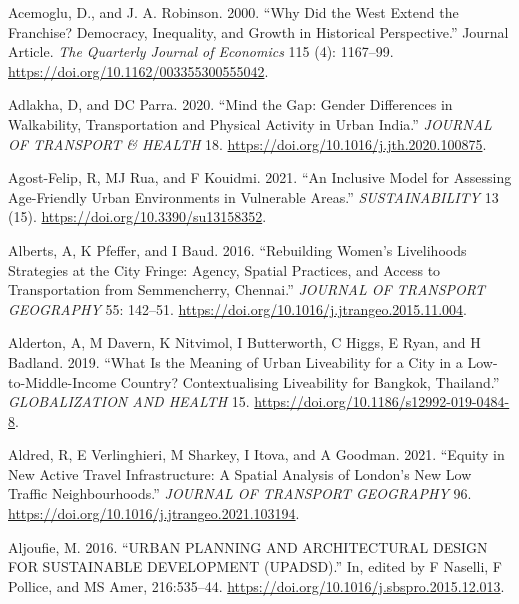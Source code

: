 \documentclass[12pt, oneside]{report}
\newlength{\cslhangindent}
\newlength{\cslentryspacingunit} %
\newenvironment{CSLReferences}[2] %
 {%
  \setlength{\parindent}{0pt}
  \ifodd #1
  \let\oldpar\par
  \def\par{\hangindent=\cslhangindent\oldpar}
  \fi
  \setlength{\parskip}{#2\cslentryspacingunit}
 }%
 {}
\begin{document}
\hypertarget{refs}{}
\begin{CSLReferences}{1}{0}
\leavevmode{}%
Acemoglu, D., and J. A. Robinson. 2000. {``Why Did the West Extend the
Franchise? Democracy, Inequality, and Growth in Historical
Perspective.''} Journal Article. \emph{The Quarterly Journal of
Economics} 115 (4): 1167--99.
\url{https://doi.org/10.1162/003355300555042}.

\leavevmode{}%
Adlakha, D, and DC Parra. 2020. {``Mind the Gap: {Gender} Differences in
Walkability, Transportation and Physical Activity in Urban {India}.''}
\emph{JOURNAL OF TRANSPORT \& HEALTH} 18.
\url{https://doi.org/10.1016/j.jth.2020.100875}.

\leavevmode{}%
Agost-Felip, R, MJ Rua, and F Kouidmi. 2021. {``An {Inclusive Model} for
{Assessing Age-Friendly Urban Environments} in {Vulnerable Areas}.''}
\emph{SUSTAINABILITY} 13 (15). \url{https://doi.org/10.3390/su13158352}.

\leavevmode{}%
Alberts, A, K Pfeffer, and I Baud. 2016. {``Rebuilding Women's
Livelihoods Strategies at the City Fringe: {Agency}, Spatial Practices,
and Access to Transportation from {Semmencherry}, {Chennai}.''}
\emph{JOURNAL OF TRANSPORT GEOGRAPHY} 55: 142--51.
\url{https://doi.org/10.1016/j.jtrangeo.2015.11.004}.

\leavevmode{}%
Alderton, A, M Davern, K Nitvimol, I Butterworth, C Higgs, E Ryan, and H
Badland. 2019. {``What Is the Meaning of Urban Liveability for a City in
a Low-to-Middle-Income Country? {Contextualising} Liveability for
{Bangkok}, {Thailand}.''} \emph{GLOBALIZATION AND HEALTH} 15.
\url{https://doi.org/10.1186/s12992-019-0484-8}.

\leavevmode{}%
Aldred, R, E Verlinghieri, M Sharkey, I Itova, and A Goodman. 2021.
{``Equity in New Active Travel Infrastructure: {A} Spatial Analysis of
{London}'s New {Low Traffic Neighbourhoods}.''} \emph{JOURNAL OF
TRANSPORT GEOGRAPHY} 96.
\url{https://doi.org/10.1016/j.jtrangeo.2021.103194}.

\leavevmode{}%
Aljoufie, M. 2016. {``URBAN PLANNING AND ARCHITECTURAL DESIGN FOR
SUSTAINABLE DEVELOPMENT (UPADSD).''} In, edited by F Naselli, F Pollice,
and MS Amer, 216:535--44.
\url{https://doi.org/10.1016/j.sbspro.2015.12.013}.


\end{CSLReferences}
\end{document}

